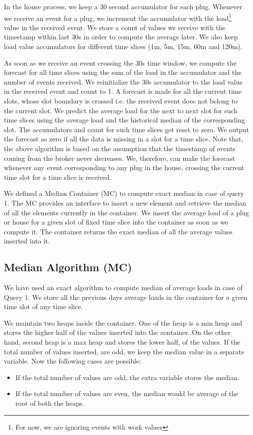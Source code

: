 In the house process, we keep a 30 second accumulator for each plug. Whenever we receive an event for a plug, we increment the accumulator with the load\footnote{For now, we are ignoring events with work values} value in the received event. We store a count of values we receive with the timestamp within last 30s in order to compute the average later. We also keep load value accumulators for different time slices (1m, 5m, 15m, 60m and 120m). 

As soon as we receive an event crossing the 30s time window, we compute the forecast for all time slices using the sum of the load in the accumulator and the number of events received. We reinitialize the 30s accumulator to the load value in the received event and count to 1. A forecast is made for all the current time slots, whose slot boundary is crossed i.e. the received event does not belong to the current slot. We predict the average load for the next to next slot for such time slices using the average load and the historical median of the corresponding slot. The accumulators and count for such time slices get reset to zero. We output the forecast as zero if all the data is missing in a slot for a time slice. Note that, the above algorithm is based on the assumption that the timestamp of events coming from the broker never decreases. We, therefore, can make the forecast whenever any event corresponding to any plug in the house, crossing the current time slot for a time slice is received.

We defined a Median Container (MC) to compute exact median in case of query 1. The MC provides an interface to insert a new element and retrieve the median of all the elements currently in the container. We insert the average load of a plug or house for a given slot of fixed time slice into the container as soon as we compute it. The container returns the exact median of all the average values inserted into it.

\subsection{Median Algorithm (MC)}
We have used an exact algorithm to compute median of average loads in case of Query 1. We store all the previous days average loads in the container for a given time slot of any time slice.

We maintain two heaps inside the container. One of the heap is a min heap and stores the higher half of the values inserted into the container. On the other hand, second heap is a max heap and stores the lower half, of the values. If the total number of values inserted, are odd, we keep the median value in a separate variable. Now the following cases are possible:
\begin{itemize}
\item If the total number of values are odd, the extra variable stores the median.
\item If the total number of values are even, the median would be average of the root of both the heaps.
\end{itemize}

